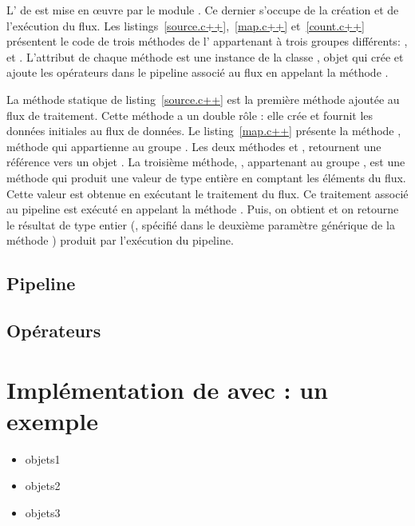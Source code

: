 



L' de  est mise en œuvre par le module . Ce dernier s'occupe de la cr\'eation et de l'ex\'ecution du flux. Les listings~\ref{source.c++},~\ref{map.c++} et~\ref{count.c++} pr\'esentent le code de trois m\'ethodes de l' appartenant \`a trois groupes diff\'erents: ,  et . L'attribut  de chaque m\'ethode est une instance de la classe , objet qui cr\'ee et ajoute les op\'erateurs dans le pipeline associ\'e au flux en appelant la m\'ethode . 

La m\'ethode statique  de listing~\ref{source.c++} est la premi\`ere m\'ethode ajout\'ee au flux de traitement. Cette m\'ethode a un double r\^ole : elle cr\'ee et fournit les donn\'ees initiales au flux de donn\'ees. Le listing~\ref{map.c++} pr\'esente la m\'ethode , m\'ethode qui appartienne au groupe . Les deux m\'ethodes  et , retournent une r\'ef\'erence vers un objet . La troisi\`eme m\'ethode, , appartenant au groupe , est une m\'ethode qui produit une valeur de type enti\`ere en comptant les \'el\'ements du flux. Cette valeur est obtenue en ex\'ecutant le traitement du flux. Ce traitement associ\'e au pipeline  est ex\'ecut\'e en appelant la m\'ethode . Puis, on obtient et on retourne le r\'esultat de type entier (, sp\'ecifi\'e dans le deuxi\`eme param\`etre générique de la m\'ethode ) produit par l'exécution du pipeline.

\subsection{Pipeline}
\subsection{Opérateurs}


\section{Impl\'ementation de  avec  : un exemple}


\begin{itemize}

\item objets1 

\item objets2 

\item objets3 


\end{itemize}
